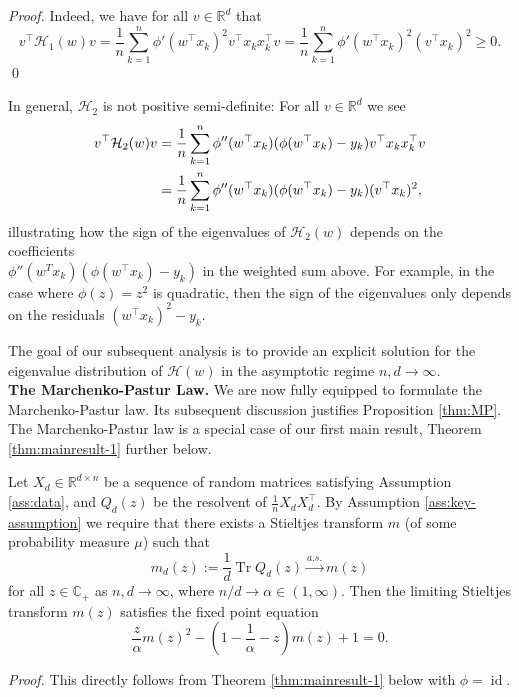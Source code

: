 \documentclass{article}
\begin{document}
\bigskip
\noindent
\emph{Proof.} Indeed, we have for all $v\in\mathbb{R}^d$ that
\begin{equation}
v^\top\mathcal{H}_1(w)v=\frac{1}{n}\sum_{k=1}^n\phi'(w^\top x_k)^2v^\top x_kx_k^\top v=\frac{1}{n}\sum_{k=1}^n\phi'(w^\top x_k)^2(v^\top x_k)^2\geq0.
\end{equation}
\qed
\bigskip
\par
In general, $\mathcal{H}_2$ is not positive semi-definite: For all $v\in\mathbb{R}^d$ we see
\begin{align}
v^\top\mathcal{H}_2(w)v&=\frac{1}{n}\sum_{k=1}^n\phi''(w^\top x_k)(\phi(w^\top x_k)-y_k)v^\top x_kx_k^\top v \notag
\\ &= \frac{1}{n}\sum_{k=1}^n\phi''(w^\top x_k)(\phi(w^\top x_k)-y_k)(v^\top x_k)^2,
\end{align}
illustrating how the sign of the eigenvalues of $\mathcal{H}_2(w)$ depends on the coefficients \\$\phi''(w^Tx_k)(\phi(w^\top x_k)-y_k)$ in the weighted sum above. For example, in the case where $\phi(z)=z^2$ is quadratic, then the sign of the eigenvalues only depends on the residuals $(w^\top x_k)^2-y_k$.
\bigskip
\par
The goal of our subsequent analysis is to provide an explicit solution for the eigenvalue distribution of $\mathcal{H}(w)$ in the asymptotic regime $n,d\to\infty$.
\bigskip
\bigskip
\\
\textbf{The Marchenko-Pastur Law.} We are now fully equipped to formulate the Marchenko-Pastur law. Its subsequent discussion justifies Proposition \ref{thm:MP}. The Marchenko-Pastur law is a special case of our first main result, Theorem \ref{thm:mainresult-1} further below.
\bigskip
\\
\begin{theorem}\label{thm:MP-stieltjes}
Let $X_d\in\mathbb{R}^{d\times n}$ be a sequence of random matrices satisfying Assumption \ref{ass:data}, and $Q_d(z)$ be the resolvent of $\frac{1}{n}X_dX_d^\top$. By Assumption \ref{ass:key-assumption} we require that there exists a Stieltjes transform $m$ (of some probability measure $\mu$) such that 
$$m_d(z):=\frac{1}{d}\operatorname{Tr}Q_d(z)\stackrel{a.s.}{\to}m(z)$$
for all $z\in\mathbb{C}_+$ as $n,d\to\infty$, where $n/d\to\alpha\in(1,\infty)$. Then the limiting Stieltjes transform $m(z)$ satisfies the fixed point equation
$$\frac{z}{\alpha}m(z)^2-\left(1-\frac{1}{\alpha}-z\right)m(z)+1=0.$$
\end{theorem}
\smallskip
\noindent
\emph{Proof.} This directly follows from Theorem \ref{thm:mainresult-1} below with $\phi=\operatorname{id}$.
\end{document}

